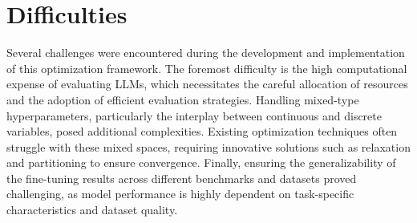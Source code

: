\section{Difficulties}
\label{sec:opt_difficulties}
Several challenges were encountered during the development and implementation of this optimization framework. The foremost difficulty is the high computational expense of evaluating LLMs, which necessitates the careful allocation of resources and the adoption of efficient evaluation strategies. Handling mixed-type hyperparameters, particularly the interplay between continuous and discrete variables, posed additional complexities. Existing optimization techniques often struggle with these mixed spaces, requiring innovative solutions such as relaxation and partitioning to ensure convergence. Finally, ensuring the generalizability of the fine-tuning results across different benchmarks and datasets proved challenging, as model performance is highly dependent on task-specific characteristics and dataset quality.